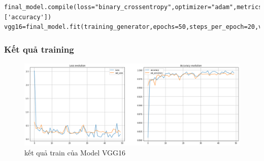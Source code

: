 \begin{lstlisting}
final_model.compile(loss="binary_crossentropy",optimizer="adam",metrics=['accuracy'])  
vgg16=final_model.fit(training_generator,epochs=50,steps_per_epoch=20,validation_data=validation_generator)
\end{lstlisting}

\subsubsection{Kết quả training}
\begin{center}
    \begin{figure}[!h]
        \centering
        \includegraphics[scale = 0.4]{fileanh/21.png}
        \caption{kết quả train của Model VGG16}
    \end{figure}
\end{center}
